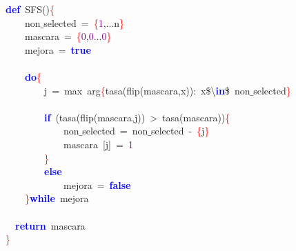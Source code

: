 \noindent
\mbox{}\textbf{\textcolor{Blue}{def}}\ SFS\textcolor{BrickRed}{()}\textcolor{Red}{\{} \\
\mbox{}\ \ \ \ non$\_$selected\ \textcolor{BrickRed}{=}\ \textcolor{Red}{\{}\textcolor{Purple}{1}\textcolor{BrickRed}{,...}n\textcolor{Red}{\}} \\
\mbox{}\ \ \ \ mascara\ \textcolor{BrickRed}{=}\ \textcolor{Red}{\{}\textcolor{Purple}{0}\textcolor{BrickRed}{,}\textcolor{Purple}{0}\textcolor{BrickRed}{...}\textcolor{Purple}{0}\textcolor{Red}{\}} \\
\mbox{}\ \ \ \ mejora\ \textcolor{BrickRed}{=}\ \textbf{\textcolor{Blue}{true}} \\
\mbox{} \\
\mbox{}\ \ \ \ \textbf{\textcolor{Blue}{do}}\textcolor{Red}{\{} \\
\mbox{}\ \ \ \ \ \ \ \ j\ \textcolor{BrickRed}{=}\ max\ arg\textcolor{Red}{\{}tasa\textcolor{BrickRed}{(}flip\textcolor{BrickRed}{(}mascara\textcolor{BrickRed}{,}x\textcolor{BrickRed}{)):}\ x\$\textcolor{BrickRed}{\textbackslash{}}\textbf{\textcolor{Blue}{in}}\$\ non$\_$selected\textcolor{Red}{\}} \\
\mbox{} \\
\mbox{}\ \ \ \ \ \ \ \ \textbf{\textcolor{Blue}{if}}\ \textcolor{BrickRed}{(}tasa\textcolor{BrickRed}{(}flip\textcolor{BrickRed}{(}mascara\textcolor{BrickRed}{,}j\textcolor{BrickRed}{))}\ \textcolor{BrickRed}{\textgreater{}}\ tasa\textcolor{BrickRed}{(}mascara\textcolor{BrickRed}{))}\textcolor{Red}{\{} \\
\mbox{}\ \ \ \ \ \ \ \ \ \ \ \ non$\_$selected\ \textcolor{BrickRed}{=}\ non$\_$selected\ \textcolor{BrickRed}{-}\ \textcolor{Red}{\{}j\textcolor{Red}{\}} \\
\mbox{}\ \ \ \ \ \ \ \ \ \ \ \ mascara\ \textcolor{BrickRed}{[}j\textcolor{BrickRed}{]}\ \textcolor{BrickRed}{=}\ \textcolor{Purple}{1} \\
\mbox{}\ \ \ \ \ \ \ \ \textcolor{Red}{\}} \\
\mbox{}\ \ \ \ \ \ \ \ \textbf{\textcolor{Blue}{else}} \\
\mbox{}\ \ \ \ \ \ \ \ \ \ \ \ mejora\ \textcolor{BrickRed}{=}\ \textbf{\textcolor{Blue}{false}} \\
\mbox{}\ \ \ \ \textcolor{Red}{\}}\textbf{\textcolor{Blue}{while}}\ mejora \\
\mbox{} \\
\mbox{}\ \ \textbf{\textcolor{Blue}{return}}\ mascara \\
\mbox{}\textcolor{Red}{\}} \\
\mbox{}
